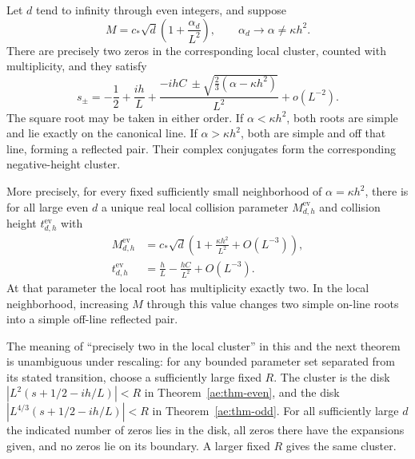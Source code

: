 \begin{theorem}\label{ae:thm-even}
Let $d$ tend to infinity through even integers, and suppose
\[
 M=c_*\sqrt d\left(1+\frac{\alpha_d}{L^2}\right),
 \qquad \alpha_d\longrightarrow\alpha\ne\kappa h^2.
\]
There are precisely two zeros in the corresponding local cluster, counted
with multiplicity, and they satisfy
\begin{equation}\label{ae:even-roots}
 s_\pm=-\frac12+\frac{ih}{L}
 +\frac{-ihC\ \pm\sqrt{\frac23(\alpha-\kappa h^2)}}{L^2}
 +o(L^{-2}).
\end{equation}
The square root may be taken in either order. If $\alpha<\kappa h^2$,
both roots are simple and lie exactly on the canonical line. If
$\alpha>\kappa h^2$, both are simple and off that line, forming a reflected
pair. Their complex conjugates form the corresponding negative-height
cluster.

More precisely, for every fixed sufficiently small neighborhood of
$\alpha=\kappa h^2$, there is for all large even $d$ a unique real local
collision parameter $M^{\mathrm{ev}}_{d,h}$ and collision height
$t^{\mathrm{ev}}_{d,h}$ with
\begin{align}
 M^{\mathrm{ev}}_{d,h}
 &=c_*\sqrt d\left(1+\frac{\kappa h^2}{L^2}+O(L^{-3})\right),
 \label{ae:even-critical}\\
 t^{\mathrm{ev}}_{d,h}
 &=\frac hL-\frac{hC}{L^2}+O(L^{-3}).\label{ae:even-height}
\end{align}
At that parameter the local root has multiplicity exactly two. In the
local neighborhood, increasing $M$ through this value changes two simple
on-line roots into a simple off-line reflected pair.
\end{theorem}

The meaning of ``precisely two in the local cluster'' in this and the next
theorem is unambiguous under rescaling: for any bounded parameter set
separated from its stated transition, choose a sufficiently large fixed
$R$. The cluster is the disk
$|L^2(s+1/2-ih/L)|<R$ in Theorem~\ref{ae:thm-even}, and the disk
$|L^{4/3}(s+1/2-ih/L)|<R$ in Theorem~\ref{ae:thm-odd}.
For all sufficiently large $d$ the indicated number of zeros lies in the
disk, all zeros there have the expansions given, and no zeros lie on its
boundary. A larger fixed $R$ gives the same cluster.

